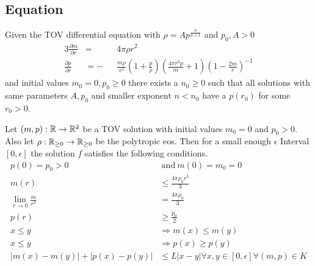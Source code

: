 \subsection{\texorpdfstring{}{TOV} Equation}
\label{subsec:5-Zeroes-TOV-Equ}
\begin{hypothesis}
	Given the \ac{TOV} differential equation with $\rho=Ap^{\frac{n}{n+1}}$ and $p_0,A>0$
	\begin{alignat}{3}
		\frac{\partial m}{\partial r} &= &&4\pi\rho r^2\\
		\frac{\partial p}{\partial r} &= -&&\frac{m\rho}{r^2}\left(1+\frac{p}{\rho}\right)\left(\frac{4\pi r^3 p}{m}+1\right)\left(1-\frac{2m}{r}\right)^{-1}
		\label{5-Zeroes-Equ-TOV-Equ}
	\end{alignat}
	and initial values $m_0=0,p_0\geq0$ there exists a $n_0\geq0$ such that all solutions with same parameters $A,p_0$ and smaller exponent $n<n_0$ have a $p(r_0)$ for some $r_0>0$.
\end{hypothesis}
\begin{lemma}
	\label{5-Zeroes-Lem-TOV-Conditions}
	Let $(m,p):\mathbb{R}\rightarrow\mathbb{R}^2$ be a \ac{TOV} solution with initial values $m_0=0$ and $p_0>0$.
	Also let $\rho:\mathbb{R}_{\geq0}\rightarrow\mathbb{R}_{\geq0}$ be the polytropic \ac{eos}.
	Then for a small enough $\epsilon$ Interval $[0,\epsilon]$ the solution $f$ satisfies the following conditions.
	\begin{align}
		p(0)=p_0>0 &\mathrm{\ and\ } m(0)=m_0=0\label{5-Zeroes-Equ-TOV-Conditions-0}\\
		m(r) &\leq \frac{4\pi\rho_0 r^3}{3}\label{5-Zeroes-Equ-TOV-Conditions-1}\\
		\lim_{r\rightarrow0}\frac{m}{r^3}&=\frac{4\pi\rho_0}{3}\label{5-Zeroes-Equ-TOV-Conditions-2}\\
		p(r)&\geq\frac{p_0}{2}\label{5-Zeroes-Equ-TOV-Conditions-3}\\
		x\leq y&\Rightarrow m(x)\leq m(y)\label{5-Zeroes-Equ-TOV-Conditions-4}\\
		x\leq y&\Rightarrow p(x)\geq p(y)\label{5-Zeroes-Equ-TOV-Conditions-5}\\
		|m(x)-m(y)|+|p(x)-p(y)|&\leq L|x-y|\forall x,y\in[0,\epsilon]\forall(m,p)\in K\label{5-Zeroes-Equ-TOV-Conditions-6}
	\end{align}
\end{lemma}
